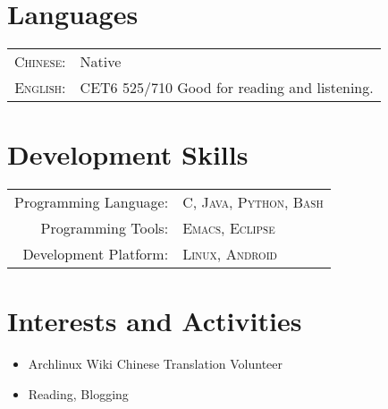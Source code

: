 \documentclass[a4paper,10pt]{article} %
\begin{document}

\section{Languages}

\begin{tabular}{rl}
\textsc{Chinese: } & Native\\
\textsc{English: } & CET6 525/710 Good for reading and listening.\\



\end{tabular}


\section{Development Skills}

\begin{tabular}{rl}
Programming Language: & \textsc{C}, \textsc{Java}, \textsc{Python}, \textsc{Bash}\setmainfont{Verdana}\\
Programming Tools: & \textsc{Emacs}, \textsc{Eclipse}\\
Development Platform: & \textsc{Linux}, \textsc{Android}
\end{tabular}


\section{Interests and Activities}

\begin{itemize}
\item Archlinux Wiki Chinese Translation Volunteer
\item Reading, Blogging
\end{itemize}
\end{document}
